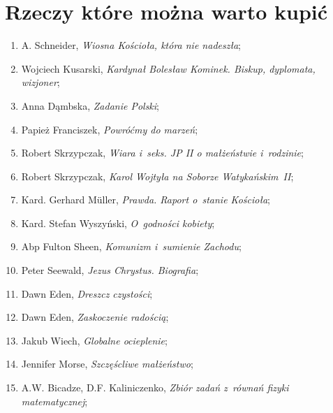 \documentclass[a4paper,11pt]{article}
\begin{document}
\newpage
\section{Rzeczy które można warto kupić}

\vspace{\spaceTwo}



\begin{enumerate}

\item A. Schneider, \textit{Wiosna Kościoła, która nie nadeszła};

\item Wojciech Kusarski, \textit{Kardynał Bolesław Kominek. Biskup,
  dyplomata, wizjoner};

\item Anna Dąmbska, \textit{Zadanie Polski};

\item Papież Franciszek, \textit{Powróćmy do marzeń};

\item Robert Skrzypczak, \textit{Wiara i~seks. JP II o małżeństwie
    i~rodzinie};

\item Robert Skrzypczak, \textit{Karol Wojtyła na Soborze Watykańskim~II};

\item Kard. Gerhard M\"{u}ller, \textit{Prawda. Raport o~stanie Kościoła};

\item Kard. Stefan Wyszyński, \textit{O~godności kobiety};

\item Abp Fulton Sheen, \textit{Komunizm i~sumienie Zachodu};

\item Peter Seewald, \textit{Jezus Chrystus. Biografia};

\item Dawn Eden, \textit{Dreszcz czystości};

\item Dawn Eden, \textit{Zaskoczenie radością};

\item Jakub Wiech, \textit{Globalne ocieplenie};

\item Jennifer Morse, \textit{Szczęścliwe małżeństwo};

\item A.W. Bicadze, D.F. Kaliniczenko, \textit{Zbiór zadań z~równań fizyki
    matematycznej};


\end{enumerate}
\end{document}
